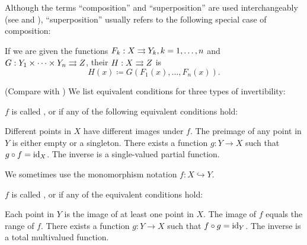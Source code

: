\begin{definition}
\begin{defenum}[resume=def:function]
     Although the terms \enquote{composition} and \enquote{superposition} are used interchangeably (see \cite[44]{Enderton1977} and \cite[]{Фихтенгольц1968/1}), \enquote{superposition} usually refers to the following special case of composition:

    If we are given the functions \( F_k: X \rightrightarrows Y_k, k = 1, \ldots, n \) and \( G: Y_1 \times \cdots \times Y_n \rightrightarrows Z \), their  \( H: X \rightrightarrows Z \) is
    \begin{equation*}
      H(x) \coloneqq G(F_1(x), \ldots, F_n(x)).
    \end{equation*}
  \end{defenum}
\end{definition}

\begin{definition}\label{def:function_invertibility}(Compare with )
  We list equivalent conditions for three types of invertibility:
  \begin{defenum}
     \( f \) is called ,  or  if any of the following equivalent conditions hold:
    \begin{defenum}
       Different points in \( X \) have different images under \( f \).
       The preimage of any point in \( Y \) is either empty or a singleton.
       There exists a function \( g: Y \to X \) such that \( g \circ f = \operatorname{id}_X \).
       The inverse is a single-valued partial function.
    \end{defenum}

    We sometimes use the monomorphism notation \( f: X \hookrightarrow Y \).

     \( f \) is called ,  or  if any of the equivalent conditions hold:
    \begin{defenum}
       Each point in \( Y \) is the image of at least one point in \( X \).
       The image of \( f \) equals the range of \( f \).
       There exists a function \( g: Y \to X \) such that \( f \circ g = \operatorname{id}_Y \).
       The inverse is a total multivalued function.
    \end{defenum}


\end{defenum}
\end{definition}
